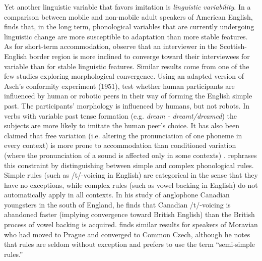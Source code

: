 \documentclass[output=paper]{langscibook}
\begin{document}
Yet another linguistic variable that favors imitation is \textit{linguistic variability}. In a comparison between mobile and non-mobile adult speakers of American English, \citet{bowie_effect_2000} finds that, in the long term, phonological variables that are currently undergoing linguistic change are more susceptible to adaptation than more stable features. As for short-term accommodation, \citet{watt_levels_2010} observe that an interviewer in the Scottish-English border region is more inclined to converge toward their interviewees for variable than for stable linguistic features. Similar results come from one of the few studies exploring morphological convergence. Using an adapted version of Asch's conformity experiment (1951), \citet{beckner_participants_2016} test whether human participants are influenced by human or robotic peers in their way of forming the English simple past. The participants' morphology is influenced by humans, but not robots. In verbs with variable past tense formation (e.g. \textit{dream - dreamt/dreamed}) the subjects are more likely to imitate the human peer's choice.
It has also been claimed that free variation  (i.e. altering the pronunciation of one phoneme in every context) is more prone to accommodation than conditioned variation (where the pronunciation of a sound is affected only in some contexts) \citep{trudgill_dialects_1986,siegel_second_2010}. \textcite{chambers_dialect_1992} rephrases this constraint by distinguishing between simple and complex phonological rules. Simple rules (such as /t/-voicing in English) are categorical in the sense that they have no exceptions, while complex rules (such as vowel backing in English) do not automatically apply in all contexts. In his study of anglophone Canadian youngsters in the south of England, he finds that Canadian /t/-voicing is abandoned faster (implying convergence toward British English) than the British process of vowel backing is acquired. \textcite{wilson_types_2011} finds similar results for speakers of Moravian who had moved to Prague and converged to Common Czech, although he notes that rules are seldom without exception and prefers to use the term ``semi-simple rules.''
\end{document}
